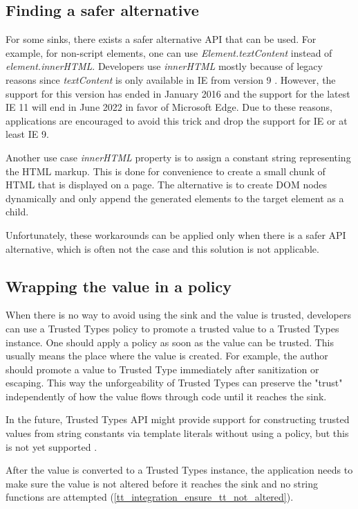 \subsection{Finding a safer alternative}

For some sinks, there exists a safer alternative API that can be used. For example, for non-script
elements, one can use \emph{Element.textContent} instead of \emph{element.innerHTML}. Developers use
\emph{innerHTML} mostly because of legacy reasons since \emph{textContent} is only available in IE
from version 9 \cite{text_content_mdn}. However, the support for this version has ended in January
2016 and the support for the latest IE 11 will end in June 2022 in favor of Microsoft Edge. Due to
these reasons, applications are encouraged to avoid this trick and drop the support for IE or at
least IE 9.

Another use case \emph{innerHTML} property is to assign a constant string representing the HTML
markup. This is done for convenience to create a small chunk of HTML that is displayed on a page.
The alternative is to create DOM nodes dynamically and only append the generated elements to the
target element as a child.

Unfortunately, these workarounds can be applied only when there is a safer API alternative, which is
often not the case and this solution is not applicable.

\subsection{Wrapping the value in a policy}

When there is no way to avoid using the sink and the value is trusted, developers can use a Trusted
Types policy to promote a trusted value to a Trusted Types instance. One should apply a policy as
soon as the value can be trusted. This usually means the place where the value is created. For
example, the author should promote a value to Trusted Type immediately after sanitization or
escaping. This way the unforgeability of Trusted Types can preserve the "trust" independently of how
the value flows through code until it reaches the sink.

In the future, Trusted Types API might provide support for constructing trusted values from string
constants via template literals without using a policy, but this is not yet supported
\cite{tt_from_literal_method}.

After the value is converted to a Trusted Types instance, the application needs to make sure the
value is not altered before it reaches the sink and no string functions are attempted
(\ref{tt_integration_ensure_tt_not_altered}).

